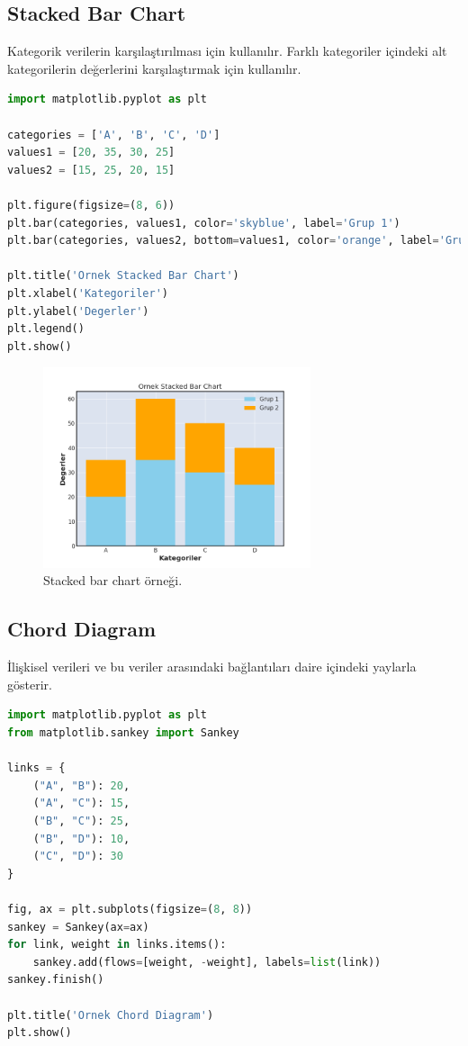 \newpage

\subsection{Stacked Bar Chart}
Kategorik verilerin karşılaştırılması için kullanılır. Farklı kategoriler içindeki alt kategorilerin değerlerini karşılaştırmak için kullanılır.

\begin{lstlisting}[language=Python]
import matplotlib.pyplot as plt

categories = ['A', 'B', 'C', 'D']
values1 = [20, 35, 30, 25]
values2 = [15, 25, 20, 15]

plt.figure(figsize=(8, 6))
plt.bar(categories, values1, color='skyblue', label='Grup 1')
plt.bar(categories, values2, bottom=values1, color='orange', label='Grup 2')

plt.title('Ornek Stacked Bar Chart')
plt.xlabel('Kategoriler')
plt.ylabel('Degerler')
plt.legend()
plt.show()
\end{lstlisting}

\begin{figure}[h]
    \centering
    \includegraphics[width=0.7\textwidth]{images/stacked_bar_chart.png}
    \caption{Stacked bar chart örneği.}
    \label{fig:enter-label}
\end{figure}

\newpage

\subsection{Chord Diagram}
İlişkisel verileri ve bu veriler arasındaki bağlantıları daire içindeki yaylarla gösterir.

\begin{lstlisting}[language=Python]
import matplotlib.pyplot as plt
from matplotlib.sankey import Sankey

links = {
    ("A", "B"): 20,
    ("A", "C"): 15,
    ("B", "C"): 25,
    ("B", "D"): 10,
    ("C", "D"): 30
}

fig, ax = plt.subplots(figsize=(8, 8))
sankey = Sankey(ax=ax)
for link, weight in links.items():
    sankey.add(flows=[weight, -weight], labels=list(link))
sankey.finish()

plt.title('Ornek Chord Diagram')
plt.show() 
\end{lstlisting}

